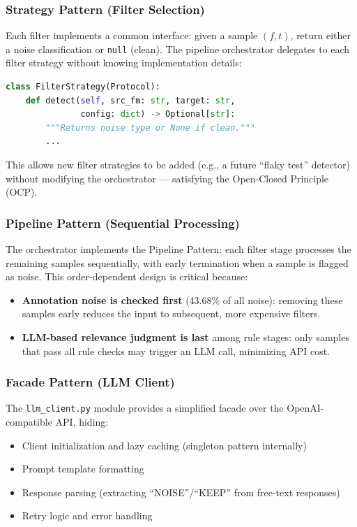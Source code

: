 \documentclass[acmlarge,nonacm,screen]{acmart}
\begin{document}
\subsubsection{Strategy Pattern (Filter Selection)}

Each filter implements a common interface: given a sample $(f, t)$, return either a noise classification or \texttt{null} (clean). The pipeline orchestrator delegates to each filter strategy without knowing implementation details:

\begin{lstlisting}[language=Python,caption={Strategy Pattern: Filter interface}]
class FilterStrategy(Protocol):
    def detect(self, src_fm: str, target: str,
               config: dict) -> Optional[str]:
        """Returns noise type or None if clean."""
        ...
\end{lstlisting}

This allows new filter strategies to be added (e.g., a future ``flaky test'' detector) without modifying the orchestrator --- satisfying the Open-Closed Principle (OCP).

\subsubsection{Pipeline Pattern (Sequential Processing)}

The orchestrator implements the Pipeline Pattern: each filter stage processes the remaining samples sequentially, with early termination when a sample is flagged as noise. This order-dependent design is critical because:
\begin{itemize}
    \item \textbf{Annotation noise is checked first} (43.68\% of all noise): removing these samples early reduces the input to subsequent, more expensive filters.
    \item \textbf{LLM-based relevance judgment is last} among rule stages: only samples that pass all rule checks may trigger an LLM call, minimizing API cost.
\end{itemize}

\subsubsection{Facade Pattern (LLM Client)}

The \texttt{llm\_client.py} module provides a simplified facade over the OpenAI-compatible API, hiding:
\begin{itemize}
    \item Client initialization and lazy caching (singleton pattern internally)
    \item Prompt template formatting
    \item Response parsing (extracting ``NOISE''/``KEEP'' from free-text responses)
    \item Retry logic and error handling
\end{itemize}
\end{document}

